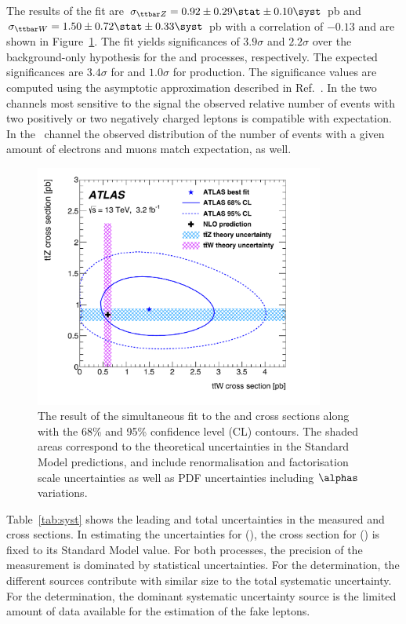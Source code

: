 The results of the fit are $\sigma_{\ttZ} = 0.92 \pm 0.29 \stat \pm 0.10 \syst$
pb and $\sigma_{\ttW} = 1.50 \pm 0.72 \stat \pm 0.33 \syst$ pb with a
correlation of $-0.13$ and are shown in Figure~\ref{fig:simfit}.  The fit
yields significances of $3.9\sigma$ and $2.2\sigma$ over the background-only
hypothesis for the \ttZ and \ttW processes, respectively. The expected
significances are $3.4\sigma$ for \ttZ and $1.0\sigma$ for \ttW production.
The significance values are computed using the asymptotic approximation described in Ref.~\cite{cls_3}. 
%
In the two channels most sensitive to the \ttW signal the observed relative
number of events with two positively or two negatively charged leptons
is compatible with expectation. In the \TLSRD\ channel the observed distribution of 
the number of events with a given amount of electrons and muons match expectation, as well.

\begin{figure}[htbp]
\centering
\includegraphics[width=0.85\textwidth]{ttZ_vs_ttW_2Dfit}
\caption{The result of the simultaneous fit to the \ttZ and \ttW cross sections
along with the 68\% and 95\% confidence level (CL) contours. The shaded areas
correspond to the theoretical uncertainties in the Standard Model predictions,
and include renormalisation and factorisation scale uncertainties as well as
PDF uncertainties including $\alphas$ variations.}
\label{fig:simfit}
\end{figure}

Table~\ref{tab:syst} shows the leading and total uncertainties in the
measured \ttZ and \ttW cross sections. In estimating the uncertainties for \ttZ (\ttW), the cross section for \ttW (\ttZ) is fixed to its
Standard Model value. For both processes, the precision of
the measurement is dominated by statistical uncertainties.  For the \ttZ determination,
the different sources contribute with similar size to the total systematic uncertainty.
For the \ttW determination, the dominant systematic uncertainty source is
the limited amount of data available for the estimation of the fake leptons.

